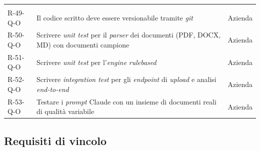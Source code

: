 \begin{longtable}{L{2cm} L{6.4cm} L{3cm}}
\hline
{}
 &  &  \\
\endfirsthead
\hline
{}
 &  &  \\
\endhead
\endfoot

R-49-Q-O & Il codice scritto deve essere versionabile tramite \emph{\gls{git}} & Azienda \\
\hline
R-50-Q-O & Scrivere \emph{unit test} per il \emph{parser} dei documenti (PDF, DOCX, MD) con documenti campione & Azienda \\
\hline
R-51-Q-O & Scrivere \emph{unit test} per l'\emph{engine} \emph{\gls{rulebased}} & Azienda \\
\hline
R-52-Q-O & Scrivere \emph{integration test} per gli \emph{endpoint} di \emph{upload} e analisi \emph{end-to-end} & Azienda \\
\hline
R-53-Q-O & Testare i \emph{prompt} Claude con un insieme di documenti reali di qualità variabile & Azienda \\
\end{longtable}
\label{tab:requisiti-qualitativi}

\subsection{Requisiti di vincolo}

